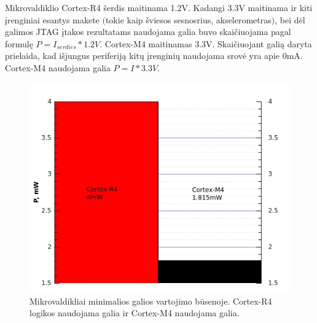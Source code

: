 \documentclass[a4paper, 12pt]{article} %
\begin{document}
\begin{onehalfspacing}
Mikrovaldiklio Cortex-R4 \v{s}erdis maitinama 1.2V. Kadangi 3.3V maitinama ir kiti \k{i}renginiai esantys makete $($tokie kaip \v{s}viesos sesnosrius, akselerometras$)$, bei d\.{e}l galimos JTAG \k{i}takos rezultatams naudojama galia buvo skai\v{c}iuojama pagal formul\k{e} $P=I_{serdies} *1.2V$. Cortex-M4 maitinamas 3.3V. Skai\v{c}iuojant gali\k{a} daryta prielaida, kad i\v{s}jungus periferij\k{a} kit\k{u} \k{i}rengini\k{u} naudojama srov\.{e} yra apie 0mA. Cortex-M4 naudojama galia $P=I*3.3V$.
\begin{figure}[H] %
\centering %
\includegraphics[scale=0.8]{pav/modes.jpg} %
\captionsetup{labelformat=numbfirst} %
\captionsetup{labelseparator=tarpas}
\caption{Mikrovaldikliai minimalios galios vartojimo b\={u}senoje. Cortex-R4 logikos naudojama galia ir Cortex-M4 naudojama galia.}
\label{vienas}
\end{figure}
\begin{figure}[H] %
\centering %

\end{figure}
\end{onehalfspacing}
\end{document}

